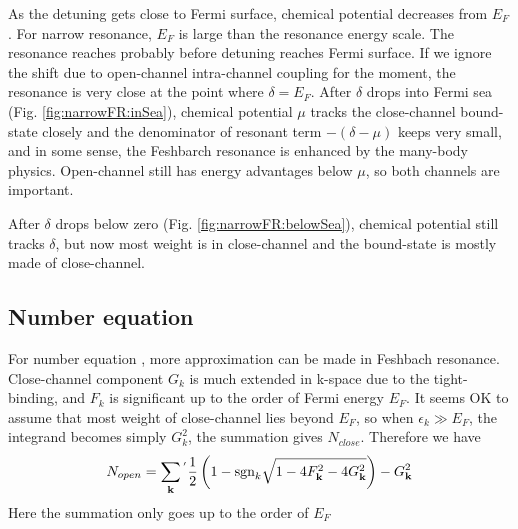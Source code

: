 As the detuning gets close to Fermi surface, chemical potential decreases from $E_{F}$. For narrow resonance, $E_{F}$ is large than the resonance energy scale.  The resonance reaches probably before detuning reaches Fermi surface.  If we ignore the shift due to open-channel intra-channel coupling for the moment, the resonance is very close at the point where $\delta=E_{F}$.  After $\delta$ drops into Fermi sea (Fig. \ref{fig:narrowFR:inSea}), chemical potential $\mu$ tracks the close-channel bound-state closely and the denominator of resonant term $-(\delta-\mu)$ keeps very small, and in some sense, the Feshbarch resonance is enhanced by the many-body  physics.  Open-channel still has energy advantages below $\mu$, so both channels are important.  

After $\delta$ drops below zero (Fig. \ref{fig:narrowFR:belowSea}), chemical potential still tracks $\delta$, but now most weight is in close-channel and the bound-state is mostly made of close-channel.  

\subsection{Number equation}
For number equation , more approximation can be made in Feshbach resonance.  Close-channel component $G_{k}$ is much extended in k-space due to the tight-binding, and $F_{k}$ is significant up to the order of Fermi energy $E_{F}$.  It seems OK to assume that most weight of close-channel lies beyond $E_{F}$, so when $\epsilon_{k}\gg{E_{F}}$, the integrand becomes simply $G_{k}^{2}$, the summation gives $N_{close}$.  Therefore we have 
\begin{equation}\label{eq:20101004:number}
N_{open}=\sum_{\mathbf{k}}{}^{'}\frac{1}{2} \left(1-\text{sgn}_{k}\sqrt{1-4 F_{\mathbf{k}}^2-4 G_{\mathbf{k}}^2}\right)-G_{\mathbf{k}}^{2}
\end{equation} 
Here the summation only goes up to the order of $E_{F}$

